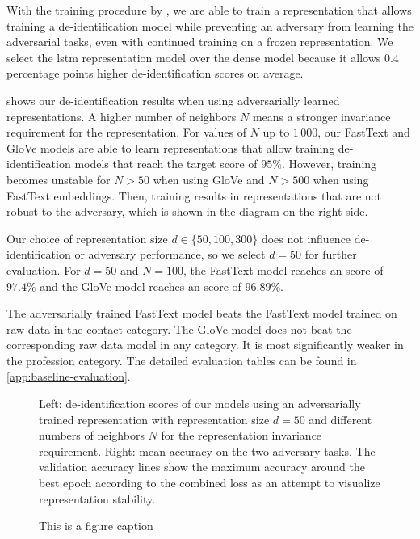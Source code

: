 \begin{description}
    With the training procedure by \citet{feutry2018learning}, we are able to train a representation that allows training a de-identification model while preventing an adversary from learning the adversarial tasks, even with continued training on a frozen representation.
    We select the \ac{lstm} representation model over the dense model because it allows $0.4$ percentage points higher de-identification \fone scores on average.
    
     shows our de-identification results when using adversarially learned representations.
    A higher number of neighbors $N$ means a stronger invariance requirement for the representation.
    For values of $N$ up to $1\,000$, our FastText and GloVe models are able to learn representations that allow training de-identification models that reach the target \fone score of $95\%$.
    However, training becomes unstable for $N>50$ when using GloVe and $N>500$ when using FastText embeddings.
    Then, training results in representations that are not robust to the adversary, which is shown in the diagram on the right side.
    
    Our choice of representation size $d \in \{50, 100, 300\}$ does not influence de-identifi\-ca\-tion or adversary performance, so we select $d=50$ for further evaluation.
    For $d=50$ and $N=100$, the FastText model reaches an \fone score of $97.4\%$ and the GloVe model reaches an \fone score of $96.89\%$.
    
    The adversarially trained FastText model beats the FastText model trained on raw data in the contact category. 
    The GloVe model does not beat the corresponding raw data model in any category.
    It is most significantly weaker in the profession category.
    The detailed evaluation tables can be found in \cref{app:baseline-evaluation}.
\end{description}

\begin{figure*}
    \centering
    
    \caption[De-identification with adversarially learned representations]{%
        Left: de-identification \fone scores of our models using an adversarially trained representation with representation size $d=50$ and different numbers of neighbors $N$ for the representation invariance requirement.
        Right: mean accuracy on the two adversary tasks.
        The validation accuracy lines show the maximum accuracy around the best epoch according to the combined loss as an attempt to visualize representation stability.
    }\label{fig:adversarial-deid}
\end{figure*}

\begin{figure*}
    \centering
    
    \caption{This is a figure caption}
\end{figure*}